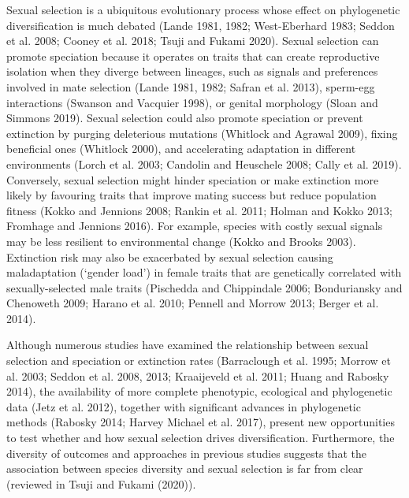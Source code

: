 \documentclass[]{article}
\begin{document}
Sexual selection is a ubiquitous evolutionary process whose effect on
phylogenetic diversification is much debated (Lande 1981, 1982;
West-Eberhard 1983; Seddon et al. 2008; Cooney et al. 2018; Tsuji and
Fukami 2020). Sexual selection can promote speciation because it
operates on traits that can create reproductive isolation when they
diverge between lineages, such as signals and preferences involved in
mate selection (Lande 1981, 1982; Safran et al. 2013), sperm-egg
interactions (Swanson and Vacquier 1998), or genital morphology (Sloan
and Simmons 2019). Sexual selection could also promote speciation or
prevent extinction by purging deleterious mutations (Whitlock and
Agrawal 2009), fixing beneficial ones (Whitlock 2000), and accelerating
adaptation in different environments (Lorch et al. 2003; Candolin and
Heuschele 2008; Cally et al. 2019). Conversely, sexual selection might
hinder speciation or make extinction more likely by favouring traits
that improve mating success but reduce population fitness (Kokko and
Jennions 2008; Rankin et al. 2011; Holman and Kokko 2013; Fromhage and
Jennions 2016). For example, species with costly sexual signals may be
less resilient to environmental change (Kokko and Brooks 2003).
Extinction risk may also be exacerbated by sexual selection causing
maladaptation (`gender load') in female traits that are genetically
correlated with sexually-selected male traits (Pischedda and Chippindale
2006; Bonduriansky and Chenoweth 2009; Harano et al. 2010; Pennell and
Morrow 2013; Berger et al. 2014).

Although numerous studies have examined the relationship between sexual
selection and speciation or extinction rates (Barraclough et al. 1995;
Morrow et al. 2003; Seddon et al. 2008, 2013; Kraaijeveld et al. 2011;
Huang and Rabosky 2014), the availability of more complete phenotypic,
ecological and phylogenetic data (Jetz et al. 2012), together with
significant advances in phylogenetic methods (Rabosky 2014; Harvey
Michael et al. 2017), present new opportunities to test whether and how
sexual selection drives diversification. Furthermore, the diversity of
outcomes and approaches in previous studies suggests that the
association between species diversity and sexual selection is far from
clear (reviewed in Tsuji and Fukami (2020)).
\end{document}
